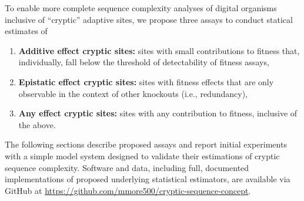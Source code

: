 



To enable more complete sequence complexity analyses of digital organisms inclusive of ``cryptic'' adaptive sites, we propose three assays to conduct statical estimates of
\begin{enumerate}
\item \textbf{Additive effect cryptic sites:} sites with small contributions to fitness that, individually, fall below the threshold of detectability of fitness assays,
\item \textbf{Epistatic effect cryptic sites:} sites with fitness effects that are only observable in the context of other knockouts (i.e., redundancy),
\item \textbf{Any effect cryptic sites:} sites with any contribution to fitness, inclusive of the above.
\end{enumerate}

The following sections describe proposed assays and report initial experiments with a simple model system designed to validate their estimations of cryptic sequence complexity.
Software and data, including full, documented implementations of proposed underlying statistical estimators, are available via GitHub at \url{https://github.com/mmore500/cryptic-sequence-concept}.
